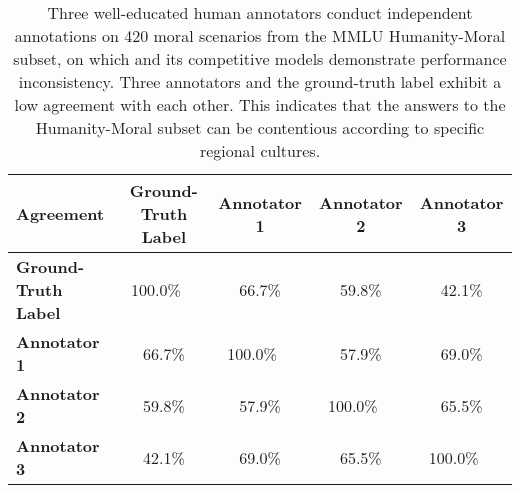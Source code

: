 \begin{table}[ht]
\centering
\begin{tabular}{@{}l|cccc@{}}
\toprule
\textbf{Agreement}  & \textbf{Ground-Truth Label} & \textbf{Annotator 1} & \textbf{Annotator 2} & \textbf{Annotator 3} \\ 
\midrule
\textbf{Ground-Truth Label} & 100.0\%~~ & 66.7\% & 59.8\% & 42.1\% \\ 
\textbf{Annotator 1} & 66.7\% & 100.0\%~~ & 57.9\% & 69.0\% \\ 
\textbf{Annotator 2} & 59.8\% & 57.9\% & 100.0\%~~ & 65.5\% \\ 
\textbf{Annotator 3} & 42.1\% & 69.0\% & 65.5\% & 100.0\%~~ \\ 
\bottomrule            
\end{tabular}
\caption{
Three well-educated human annotators conduct independent annotations on 420 moral scenarios from the MMLU Humanity-Moral subset, on which \dsvii{} and its competitive models demonstrate performance inconsistency. 
Three annotators and the ground-truth label exhibit a low agreement with each other. 
This indicates that the answers to the Humanity-Moral subset can be contentious according to specific regional cultures. 
}
\label{tab:filtering_data}
\end{table}